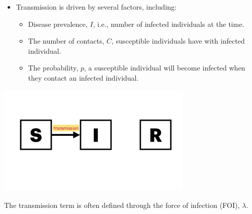 \documentclass[
  ignorenonframetext,
]{beamer}
\providecommand{\tightlist}{%
  \setlength{\itemsep}{0pt}\setlength{\parskip}{0pt}}\usepackage{longtable,booktabs,array}
\begin{document}
\begin{frame}
\begin{itemize}
\tightlist
\item
  Transmission is driven by several factors, including:

  \begin{itemize}
  \tightlist
  \item
    Disease prevalence, {\(I\)}, i.e., number of infected individuals at
    the time.
  \item
    The number of contacts, {\(C\)}, susceptible individuals have with
    infected individual.
  \item
    The probability, {\(p\)}, a susceptible individual will become
    infected when they contact an infected individual.
  \end{itemize}
\end{itemize}
\end{frame}

\begin{frame}
\includegraphics[width=0.7\textwidth,height=\textheight]{images/model_diagrams/model_diagrams.002.jpeg}

The transmission term is often defined through the {force of infection
(FOI), \(\lambda\)}.
\end{frame}
\end{document}
